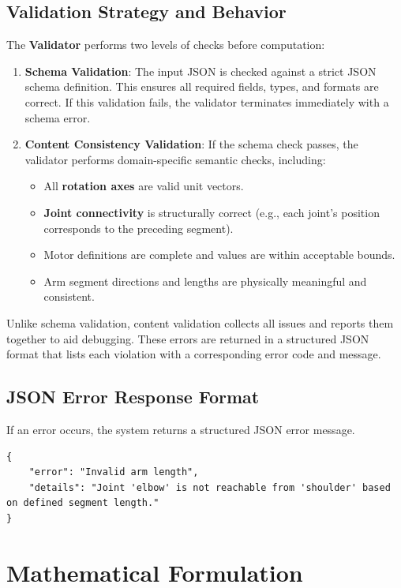 \documentclass{article}
\begin{document}
\subsection{Validation Strategy and Behavior}
The \textbf{Validator} performs two levels of checks before computation:

\begin{enumerate}
	\item \textbf{Schema Validation}: The input JSON is checked against a strict JSON schema definition. This ensures all required fields, types, and formats are correct. If this validation fails, the validator terminates immediately with a schema error.
	
	\item \textbf{Content Consistency Validation}: If the schema check passes, the validator performs domain-specific semantic checks, including:
	\begin{itemize}
		\item All \textbf{rotation axes} are valid unit vectors.
		\item \textbf{Joint connectivity} is structurally correct (e.g., each joint's position corresponds to the preceding segment).
		\item Motor definitions are complete and values are within acceptable bounds.
		\item Arm segment directions and lengths are physically meaningful and consistent.
	\end{itemize}
\end{enumerate}

Unlike schema validation, content validation collects all issues and reports them together to aid debugging. These errors are returned in a structured JSON format that lists each violation with a corresponding error code and message.


\subsection{JSON Error Response Format}
If an error occurs, the system returns a structured JSON error message.

\begin{verbatim}
{
    "error": "Invalid arm length",
    "details": "Joint 'elbow' is not reachable from 'shoulder' based on defined segment length."
}
\end{verbatim}

\section{Mathematical Formulation}
\end{document}
